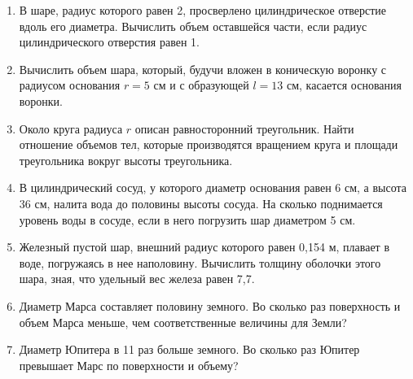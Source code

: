 \documentclass[twoside]{book}
\begin{document}
\begin{enumerate}
\item
В шаре, радиус которого равен 2, просверлено цилиндрическое отверстие вдоль его диаметра.
Вычислить объем оставшейся части, если радиус цилиндрического отверстия равен 1.

\item
Вычислить объем шара, который, будучи вложен в коническую воронку с радиусом основания $r = 5$ см и с образующей $l = 13$ см, касается основания воронки.

\item
Около круга радиуса $r$ описан равносторонний треугольник.
Найти отношение объемов тел, которые производятся вращением круга и площади треугольника вокруг высоты треугольника.

\item
В цилиндрический сосуд, у которого диаметр основания равен 6 см, а высота 36 см, налита вода до половины высоты сосуда.
На сколько поднимается уровень воды в сосуде, если в него погрузить шар диаметром 5 см.

\item
Железный пустой шар, внешний радиус которого равен 0,154 м, плавает в воде, погружаясь в нее наполовину.
Вычислить толщину оболочки этого шара, зная, что удельный вес железа равен 7,7.

\item
Диаметр Марса составляет половину земного.
Во сколько раз поверхность и объем Марса меньше, чем соответственные величины для Земли?

\item
Диаметр Юпитера в 11 раз больше земного.
Во сколько раз Юпитер превышает Марс по поверхности и объему? %
\end{enumerate}
\end{document}
